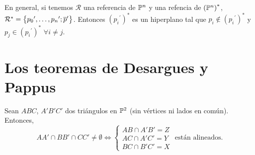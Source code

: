 \begin{obs}
En general, si tenemos $\mathcal{R}$ una referencia de $\mathbb{P}^n$ y una
refencia de $\left( \mathbb{P}^n \right)^*$, $\mathcal{R}^* = \left\{{p_0}^\prime,
\dots,{p_n}^\prime; \overline{p}^\prime\right\}$. Entonces $\left( {p_i}^\prime \right)^*$
es un hiperplano tal que $p_i \notin \left( {p_i}^\prime \right)^*$ y
$p_j \in \left( {p_i}^\prime \right)^*$ $\forall i \neq j$.
\end{obs}

\section{Los teoremas de Desargues y Pappus}

\begin{teo}[de Desargues]

Sean $ABC$, $A'B'C'$ dos triángulos en $\mathbb{P}^2$ (sin vértices ni lados en común). Entonces,
\[
AA' \cap BB' \cap CC' \neq \emptyset \iff
\begin{cases}
AB \cap A'B' = Z \\
AC \cap A'C' = Y \\
BC \cap B'C' = X
\end{cases}
\text{ están alineados.}
\]


\end{teo}
